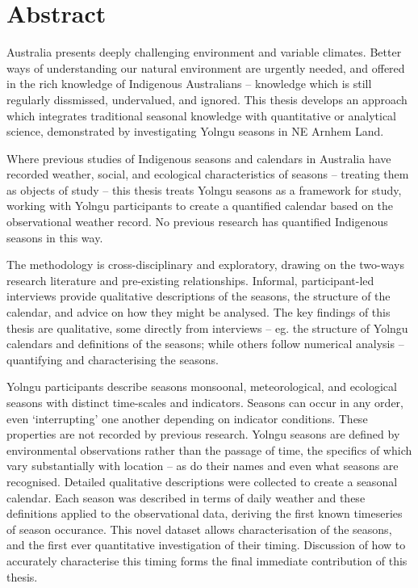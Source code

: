 \chapter{Abstract}

Australia presents deeply challenging environment and variable climates.
Better ways of understanding our natural environment are urgently needed, and
offered in the rich knowledge of Indigenous Australians -- knowledge which
is still regularly dissmissed, undervalued, and ignored.
%
This thesis develops an approach which integrates traditional seasonal knowledge
with quantitative or analytical science, demonstrated by investigating Yolngu
seasons in NE Arnhem Land.

Where previous studies of Indigenous seasons and calendars in Australia have
recorded weather, social, and ecological characteristics of seasons -- treating
them as objects of study -- this thesis treats Yolngu seasons as a framework
for study, working with Yolngu participants to create a quantified calendar
based on the observational weather record.  No previous research has quantified
Indigenous seasons in this way.


The methodology is cross-disciplinary and exploratory, drawing on the two-ways
research literature and pre-existing relationships.  Informal, participant-led
interviews provide qualitative descriptions of the seasons, the structure of
the calendar, and advice on how they might be analysed.
%
The key findings of this thesis are qualitative, some directly from interviews
-- eg. the structure of Yolngu calendars and definitions of the seasons; while
others follow numerical analysis -- quantifying and characterising the seasons.


Yolngu participants describe seasons monsoonal, meteorological, and ecological
seasons with distinct time-scales and indicators.  Seasons can occur in any
order, even `interrupting' one another depending on indicator conditions.
These properties are not recorded by previous research.
%
Yolngu seasons are defined by environmental observations rather than the
passage of time, the specifics of which vary substantially with location --
as do their names and even what seasons are recognised.  Detailed qualitative
descriptions were collected to create a seasonal calendar.
%
Each season was described in terms of daily weather and these definitions
applied to the observational data, deriving the first known timeseries of
season occurance.  This novel dataset allows characterisation of the seasons,
and the first ever quantitative investigation of their timing.  Discussion
of how to accurately characterise this timing forms the final immediate
contribution of this thesis.

